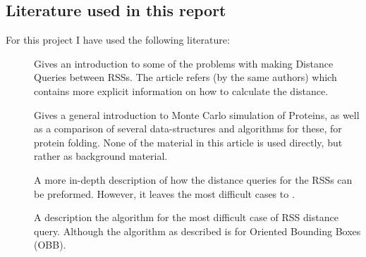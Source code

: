 \subsection{Literature used in this report}
For this project I have used the following literature: 
\begin{description}
\item[\cite{larsen00fast}] Gives an introduction to some of the problems with making Distance Queries between RSSs. The article refers \cite{Larsen99fastproximity} (by the same authors) which contains more explicit information on how to calculate the distance. 
\item[\cite{Lotan03algorithmand}] Gives a general introduction to Monte Carlo simulation of Proteins, as well as a comparison of several data-structures and algorithms for these, for protein folding. None of the material in this article is used directly, but rather as background material.
\item[\cite{Larsen99fastproximity}] A more in-depth description of how the distance queries for the RSSs can be preformed. However, it leaves the most difficult cases to \cite{237244}.
\item[\cite{237244}] A description the algorithm for the most difficult case of RSS distance query. Although the algorithm as described is for Oriented Bounding Boxes (OBB).
\end{description}

